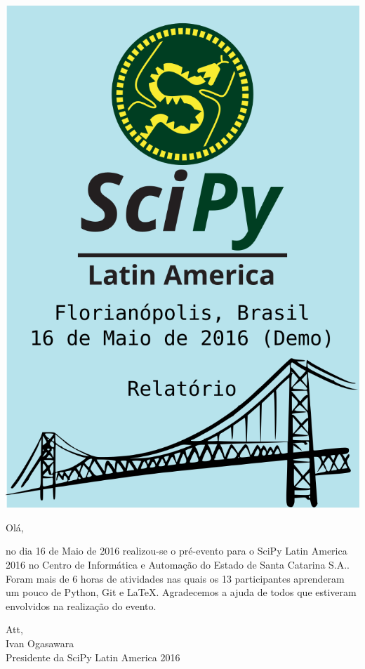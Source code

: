 \documentclass[12pt]{article}
\begin{document}
\thispagestyle{empty}
\noindent  %
\includegraphics{capa}
\NoBgThispage

\clearpage

\restoregeometry

\newpage

Olá,

no dia 16 de Maio de 2016 realizou-se o pré-evento para o SciPy Latin America
2016 no Centro de Informática e Automação do Estado de Santa Catarina S.A..
Foram mais de 6 horas de atividades nas quais os 13 participantes aprenderam um
pouco de Python, Git e LaTeX.
Agradecemos a ajuda de todos que estiveram envolvidos na realização do evento.

Att, \\
\indent Ivan Ogasawara \\
\indent Presidente da SciPy Latin America 2016
\end{document}
